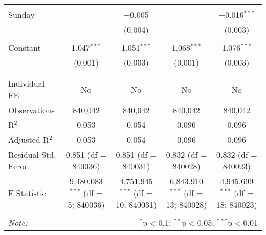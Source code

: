 \documentclass[
]{article}
\begin{document}
\begin{table}[!htbp]
{\begin{tabular}{@{\extracolsep{5pt}}lcccc}
  & & & & \\ 
 Sunday &  & $-$0.005 &  & $-$0.016$^{***}$ \\ 
  &  & (0.004) &  & (0.003) \\ 
  & & & & \\ 
 Constant & 1.047$^{***}$ & 1.051$^{***}$ & 1.068$^{***}$ & 1.076$^{***}$ \\ 
  & (0.001) & (0.003) & (0.001) & (0.003) \\ 
  & & & & \\ 
\hline \\[-1.8ex] 
Individual FE & No & No & No & No \\ 
Observations & 840,042 & 840,042 & 840,042 & 840,042 \\ 
R$^{2}$ & 0.053 & 0.054 & 0.096 & 0.096 \\ 
Adjusted R$^{2}$ & 0.053 & 0.054 & 0.096 & 0.096 \\ 
Residual Std. Error & 0.851 (df = 840036) & 0.851 (df = 840031) & 0.832 (df = 840028) & 0.832 (df = 840023) \\ 
F Statistic & 9,480.083$^{***}$ (df = 5; 840036) & 4,751.945$^{***}$ (df = 10; 840031) & 6,843.910$^{***}$ (df = 13; 840028) & 4,945.699$^{***}$ (df = 18; 840023) \\ 
\hline 
\hline \\[-1.8ex] 
\textit{Note:}  & \multicolumn{4}{r}{$^{*}$p$<$0.1; $^{**}$p$<$0.05; $^{***}$p$<$0.01} \\ 
\end{tabular}
} 
\end{table} 
\newpage
\end{document}
